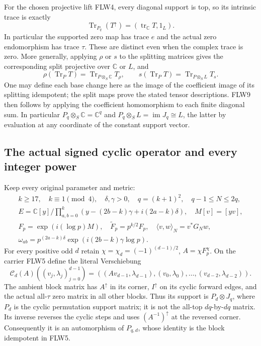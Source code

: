 For the chosen projective lift FLW4, every diagonal support is top,
so its intrinsic trace is exactly
\[
 \operatorname{Tr}_{P_q}(T^\uparrow)
       =(\operatorname{tr}_{\mathbb C}T,1_L).
 \tag{FLW8}
\]
In particular the supported zero map has trace $e$ and the actual
zero endomorphism has trace $\tau$. These are distinct even when the
complex trace is zero. More generally, applying $\rho$ or $s$ to
the splitting matrices gives the corresponding split projective
over $\mathbb C$ or $L$, and
\[
 \rho(\operatorname{Tr}_P T)
       =\operatorname{Tr}_{P\otimes_S\mathbb C}T_\rho,
 \qquad
 s(\operatorname{Tr}_P T)
       =\operatorname{Tr}_{P\otimes_S L}T_s.
 \tag{FLW9}
\]
One may define each base change here as the image of the coefficient
image of its splitting idempotent; the split maps prove the stated
tensor descriptions. FLW9 then follows by applying the coefficient
homomorphism to each finite diagonal sum. In particular
$P_q\otimes_S\mathbb C=\mathbb C^q$ and
$P_q\otimes_S L=\operatorname{im}J_q\cong L$, the latter by
evaluation at any coordinate of the constant support vector.

\subsection{The actual signed cyclic operator and every integer power}

Keep every original parameter and metric:
\[
\begin{gathered}
 k\ge17,\quad k\equiv1\pmod4,\quad\delta,\gamma>0,
 \quad q=(k+1)^2,\quad q-1\le N\le2q,\\
 E=\mathbb C[y]/\prod_{a,b=0}^k
      (y-(2b-k)\gamma+i(2a-k)\delta),\quad M[v]=[yv],\\
 F_p=\exp(i(\log p)M),\quad\widetilde F_p=p^{k/2}F_p,
 \quad\langle v,w\rangle_N=v^*G_Nw,\\
 \omega_{ab}=p^{(2a-k)\delta}
                 \exp(i(2b-k)\gamma\log p).
\end{gathered}
\tag{FLW10}
\]
For every positive odd $d$ retain
$\chi=\chi_d=(-1)^{(d-1)/2}$, $A=\chi F_p^\chi$.
On the carrier FLW5 define the literal Verschiebung
\[
 \mathcal C_d(A)((v_j,\lambda_j)_{j=0}^{d-1})
 =((Av_{d-1},\lambda_{d-1}),
                       (v_0,\lambda_0),\ldots,(v_{d-2},\lambda_{d-2})).
 \tag{FLW11}
\]
The ambient block matrix has $A^\uparrow$ in its corner,
$I^\uparrow$ on its cyclic forward edges, and the actual
all-$\tau$ zero matrix in all other blocks. Thus its support is
$P_d\otimes J_q$, where $P_d$ is the cyclic permutation support
matrix; it is not the all-top $dq$-by-$dq$ matrix.
Its inverse reverses the cyclic steps and uses $(A^{-1})^\uparrow$
at the reversed corner. Consequently it is an automorphism of
$P_{q,d}$, whose identity is the block idempotent in FLW5.


